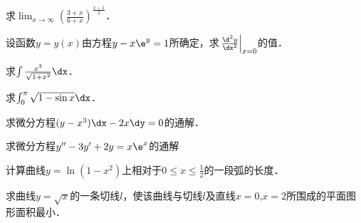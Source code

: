 \documentclass[plain,noanswer,medmath]{../../template/jnuexam}
\begin{document}


\begin{problem}
求$\lim_{x \to \infty} \left(\frac{3 + x}{6 + x} \right)^{\frac{x - 1}{2}}$．
\end{problem}


\begin{problem}
设函数$y = y(x)$由方程$y - x\e^y = 1$所确定，求$\left. \frac{\d^2 y}{\dx^2} \right|_{x = 0}$的值．
\end{problem}


\begin{problem}
求$\int \frac{x^3}{\sqrt{1 + x^2}} \dx$．
\end{problem}


\begin{problem}
求$\int_0^{\pi}\sqrt{1 - \sin x} \dx$．
\end{problem}


\begin{problem}
求微分方程$(y - x^3)\dx - 2x\dy = 0$的通解．
\end{problem}






\begin{problem}
求微分方程$y'' - 3y' + 2y = x\e^x$的通解
\end{problem}



\begin{problem}
计算曲线$y = \ln(1 - x^2)$上相对于$0 \le x \le \frac{1}{2}$的一段弧的长度．
\end{problem}



\begin{problem}
求曲线$y = \sqrt{x}$的一条切线$l$，使该曲线与切线$l$及直线$x = 0$,$x = 2$所围成的平面图形面积最小．
\end{problem}



\end{document}
